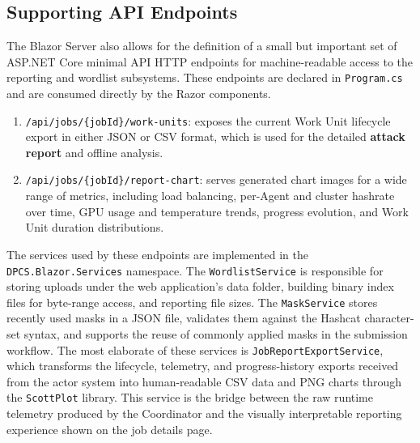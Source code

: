 \subsection{Supporting API Endpoints}

The Blazor Server also allows for the definition of a small but important set of ASP.NET Core minimal API HTTP endpoints for machine-readable access to the reporting and wordlist subsystems. These endpoints are declared in \verb|Program.cs| and are consumed directly by the Razor components.

\begin{enumerate}
    \item \verb|/api/jobs/{jobId}/work-units|: exposes the current Work Unit lifecycle export in either JSON or CSV format, which is used for the detailed \textbf{attack report} and offline analysis.
    
    \item \verb|/api/jobs/{jobId}/report-chart|: serves generated chart images for a wide range of metrics, including load balancing, per-Agent and cluster hashrate over time, GPU usage and temperature trends, progress evolution, and Work Unit duration distributions.
\end{enumerate}

The services used by these endpoints are implemented in the \verb|DPCS.Blazor.Services| namespace. The \verb|WordlistService| is responsible for storing uploads under the web application's data folder, building binary index files for byte-range access, and reporting file sizes. The \verb|MaskService| stores recently used masks in a JSON file, validates them against the Hashcat character-set syntax, and supports the reuse of commonly applied masks in the submission workflow. The most elaborate of these services is \verb|JobReportExportService|, which transforms the lifecycle, telemetry, and progress-history exports received from the actor system into human-readable CSV data and PNG charts through the \verb|ScottPlot| library\cite{scottplot}. This service is the bridge between the raw runtime telemetry produced by the Coordinator and the visually interpretable reporting experience shown on the job details page.




